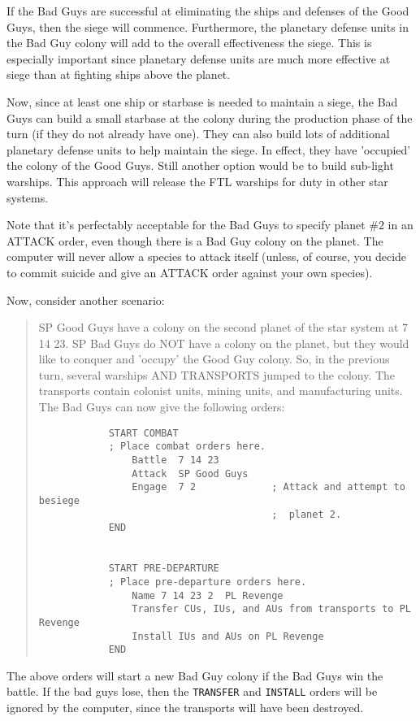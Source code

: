 \documentclass[10pt,titlepage]{article}
\begin{document}
If the Bad Guys are successful at eliminating the ships and defenses of the
Good Guys, then the siege will commence.  Furthermore, the planetary defense
units in the Bad Guy colony will add to the overall effectiveness the siege.
This is especially important since planetary defense units are much more
effective at siege than at fighting ships above the planet.

Now, since at least one ship or starbase is needed to maintain a siege, the
Bad Guys can build a small starbase at the colony during the production phase
of the turn (if they do not already have one).  They can also build lots of
additional planetary defense units to help maintain the siege.  In effect, they
have 'occupied' the colony of the Good Guys.  Still another option would be to
build sub-light warships.  This approach will release the FTL warships for duty
in other star systems.

Note that it's perfectably acceptable for the Bad Guys to specify planet \#2
in an ATTACK order, even though there is a Bad Guy colony on the planet.  The
computer will never allow a species to attack itself (unless, of course, you
decide to commit suicide and give an ATTACK order against your own species).

Now, consider another scenario:
\begin{quotation}
	SP Good Guys have a colony on the second planet of the star system
	at 7 14 23.  SP Bad Guys do NOT have a colony on the planet, but
	they would like to conquer and 'occupy' the Good Guy colony.  So,
	in the previous turn, several warships AND TRANSPORTS jumped to the
	colony.  The transports contain colonist units, mining units, and
	manufacturing units.  The Bad Guys can now give the following orders:

\begin{verbatim}
            START COMBAT
            ; Place combat orders here.
                Battle  7 14 23
                Attack  SP Good Guys
                Engage  7 2             ; Attack and attempt to besiege
                                        ;  planet 2.
            END


            START PRE-DEPARTURE
            ; Place pre-departure orders here.
                Name 7 14 23 2  PL Revenge
                Transfer CUs, IUs, and AUs from transports to PL Revenge
                Install IUs and AUs on PL Revenge
            END
\end{verbatim} 
\end{quotation}
The above orders will start a new Bad Guy colony if the Bad Guys win the
battle.  If the bad guys lose, then the \texttt{TRANSFER} and \texttt{INSTALL} orders will be
ignored by the computer, since the transports will have been destroyed.
\end{document}
